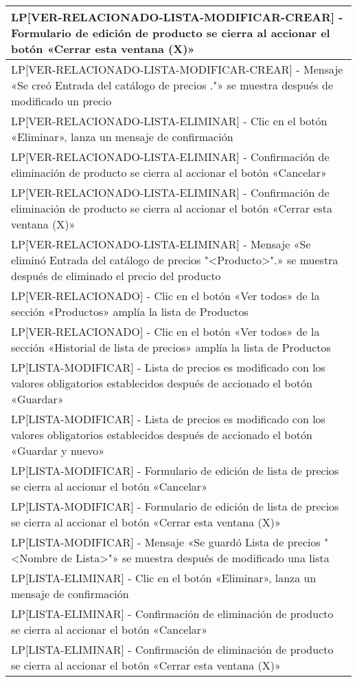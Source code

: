 \begin{longtable}{|p{15.0cm}|}
LP[VER-RELACIONADO-LISTA-MODIFICAR-CREAR] - Formulario de edición de producto se cierra al accionar el botón «Cerrar esta ventana (X)» \\ \hline
LP[VER-RELACIONADO-LISTA-MODIFICAR-CREAR] - Mensaje «Se creó Entrada del catálogo de precios ."» se muestra después de modificado un precio \\ \hline
LP[VER-RELACIONADO-LISTA-ELIMINAR] - Clic en el botón «Eliminar», lanza un mensaje de confirmación \\ \hline
LP[VER-RELACIONADO-LISTA-ELIMINAR] - Confirmación de eliminación de producto se cierra al accionar el botón «Cancelar» \\ \hline
LP[VER-RELACIONADO-LISTA-ELIMINAR] - Confirmación de eliminación de producto se cierra al accionar el botón «Cerrar esta ventana (X)» \\ \hline
LP[VER-RELACIONADO-LISTA-ELIMINAR] - Mensaje «Se eliminó Entrada del catálogo de precios "<Producto>".» se muestra después de eliminado el precio del producto \\ \hline
LP[VER-RELACIONADO] - Clic en el botón «Ver todos» de la sección «Productos» amplía la lista de Productos \\ \hline
LP[VER-RELACIONADO] - Clic en el botón «Ver todos» de la sección «Historial de lista de precios» amplía la lista de Productos \\ \hline
LP[LISTA-MODIFICAR] - Lista de precios es modificado con los valores obligatorios establecidos después de accionado el botón «Guardar» \\ \hline
LP[LISTA-MODIFICAR] - Lista de precios es modificado con los valores obligatorios establecidos después de accionado el botón «Guardar y nuevo» \\ \hline
LP[LISTA-MODIFICAR] - Formulario de edición de lista de precios se cierra al accionar el botón «Cancelar» \\ \hline
LP[LISTA-MODIFICAR] - Formulario de edición de lista de precios se cierra al accionar el botón «Cerrar esta ventana (X)» \\ \hline
LP[LISTA-MODIFICAR] - Mensaje «Se guardó Lista de precios "<Nombre de Lista>"» se muestra después de modificado una lista \\ \hline
LP[LISTA-ELIMINAR] - Clic en el botón «Eliminar», lanza un mensaje de confirmación \\ \hline
LP[LISTA-ELIMINAR] - Confirmación de eliminación de producto se cierra al accionar el botón «Cancelar» \\ \hline
LP[LISTA-ELIMINAR] - Confirmación de eliminación de producto se cierra al accionar el botón «Cerrar esta ventana (X)» \\ \hline

\end{longtable}
